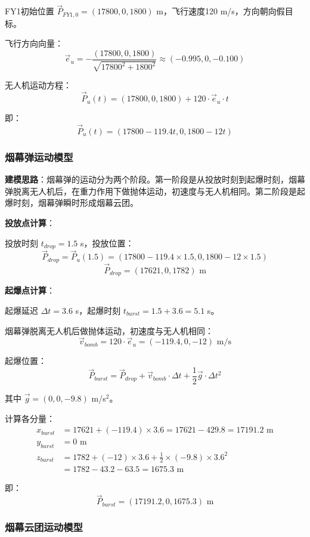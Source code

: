 \documentclass[12pt,a4paper]{article}
\begin{document}
FY1初始位置 $\vec{P}_{FY1,0} = (17800, 0, 1800)$ m，飞行速度120 m/s，方向朝向假目标。

飞行方向向量：
$$\vec{e}_u = -\frac{(17800, 0, 1800)}{\sqrt{17800^2 + 1800^2}} \approx (-0.995, 0, -0.100)$$

无人机运动方程：
$$\vec{P}_u(t) = (17800, 0, 1800) + 120 \cdot \vec{e}_u \cdot t$$

即：
$$\vec{P}_u(t) = (17800 - 119.4t, 0, 1800 - 12t)$$

\subsubsection{烟幕弹运动模型}

\textbf{建模思路}：烟幕弹的运动分为两个阶段。第一阶段是从投放时刻到起爆时刻，烟幕弹脱离无人机后，在重力作用下做抛体运动，初速度与无人机相同。第二阶段是起爆时刻，烟幕弹瞬时形成烟幕云团。

\textbf{投放点计算}：

投放时刻 $t_{drop} = 1.5$ s，投放位置：
$$\vec{P}_{drop} = \vec{P}_u(1.5) = (17800 - 119.4 \times 1.5, 0, 1800 - 12 \times 1.5)$$
$$\vec{P}_{drop} = (17621, 0, 1782) \text{ m}$$

\textbf{起爆点计算}：

起爆延迟 $\Delta t = 3.6$ s，起爆时刻 $t_{burst} = 1.5 + 3.6 = 5.1$ s。

烟幕弹脱离无人机后做抛体运动，初速度与无人机相同：
$$\vec{v}_{bomb} = 120 \cdot \vec{e}_u = (-119.4, 0, -12) \text{ m/s}$$

起爆位置：
$$\vec{P}_{burst} = \vec{P}_{drop} + \vec{v}_{bomb} \cdot \Delta t + \frac{1}{2}\vec{g} \cdot \Delta t^2$$

其中 $\vec{g} = (0, 0, -9.8)$ m/s$^2$。

计算各分量：
\begin{align}
x_{burst} &= 17621 + (-119.4) \times 3.6 = 17621 - 429.8 = 17191.2 \text{ m} \\
y_{burst} &= 0 \text{ m} \\
z_{burst} &= 1782 + (-12) \times 3.6 + \frac{1}{2} \times (-9.8) \times 3.6^2 \\
&= 1782 - 43.2 - 63.5 = 1675.3 \text{ m}
\end{align}

即：
$$\vec{P}_{burst} = (17191.2, 0, 1675.3) \text{ m}$$

\subsubsection{烟幕云团运动模型}
\end{document}
